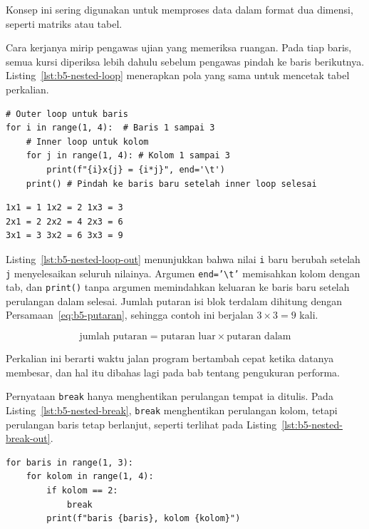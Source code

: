 Konsep ini sering digunakan untuk memproses data dalam format dua dimensi, seperti matriks atau tabel.

Cara kerjanya mirip pengawas ujian yang memeriksa ruangan. Pada tiap baris, semua kursi diperiksa lebih dahulu sebelum pengawas pindah ke baris berikutnya. Listing~\ref{lst:b5-nested-loop} menerapkan pola yang sama untuk mencetak tabel perkalian.

\begin{lstlisting}[style=PythonStyle, caption={Kode Python: nested_loop.py}, label={lst:b5-nested-loop}]
# Outer loop untuk baris
for i in range(1, 4):  # Baris 1 sampai 3
    # Inner loop untuk kolom
    for j in range(1, 4): # Kolom 1 sampai 3
        print(f"{i}x{j} = {i*j}", end='\t')
    print() # Pindah ke baris baru setelah inner loop selesai
\end{lstlisting}

\begin{lstlisting}[language=bash, caption={Keluaran nested_loop.py}, label={lst:b5-nested-loop-out}]
1x1 = 1 1x2 = 2 1x3 = 3
2x1 = 2 2x2 = 4 2x3 = 6
3x1 = 3 3x2 = 6 3x3 = 9
\end{lstlisting}

Listing~\ref{lst:b5-nested-loop-out} menunjukkan bahwa nilai \texttt{i} baru berubah setelah \texttt{j} menyelesaikan seluruh nilainya. Argumen \texttt{end='\textbackslash t'} memisahkan kolom dengan tab, dan \texttt{print()} tanpa argumen memindahkan keluaran ke baris baru setelah perulangan dalam selesai. Jumlah putaran isi blok terdalam dihitung dengan Persamaan~\eqref{eq:b5-putaran}, sehingga contoh ini berjalan $3 \times 3 = 9$ kali.

\begin{equation}
  \text{jumlah putaran} = \text{putaran luar} \times \text{putaran dalam}
  \label{eq:b5-putaran}
\end{equation}

Perkalian ini berarti waktu jalan program bertambah cepat ketika datanya membesar, dan hal itu dibahas lagi pada bab tentang pengukuran performa.

Pernyataan \texttt{break} hanya menghentikan perulangan tempat ia ditulis. Pada Listing~\ref{lst:b5-nested-break}, \texttt{break} menghentikan perulangan kolom, tetapi perulangan baris tetap berlanjut, seperti terlihat pada Listing~\ref{lst:b5-nested-break-out}.

\begin{lstlisting}[style=PythonStyle, caption={Kode Python: nested_break.py}, label={lst:b5-nested-break}]
for baris in range(1, 3):
    for kolom in range(1, 4):
        if kolom == 2:
            break
        print(f"baris {baris}, kolom {kolom}")
\end{lstlisting}


